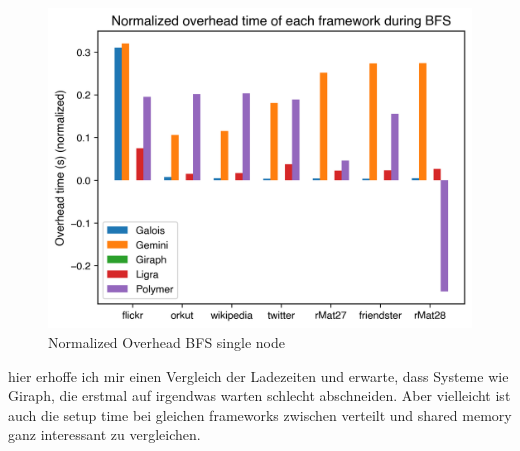 \begin{figure}
	\includegraphics[width=\columnwidth]{../../plots/singleNodeBFS_overheadTimeNormalized.png}
	\caption{Normalized Overhead BFS single node}
	\label{fig:singleNodeBFS_overheadNormalized}
\end{figure}

hier erhoffe ich mir einen Vergleich der Ladezeiten und erwarte, dass Systeme wie Giraph, die erstmal auf irgendwas warten schlecht abschneiden.
Aber vielleicht ist auch die setup time bei gleichen frameworks zwischen verteilt und shared memory ganz interessant zu vergleichen. 
